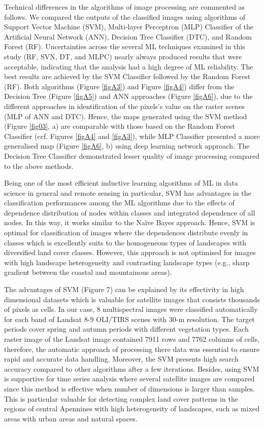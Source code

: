 \documentclass[remotesensing,article,submit,pdftex,moreauthors]{Definitions/mdpi}
\begin{document}
Technical differences in the algorithms of image processing are commented as follows. We compared the outputs of the classified images using algorithms of Support Vector Machine (SVM), Multi-layer Perceptron (MLP) Classifier of the Artificial Neural Network (ANN), Decision Tree Classifier (DTC), and Random Forest (RF). Uncertainties across the several ML techniques examined in this study (RF, SVN, DT, and MLPC) nearly always produced results that were acceptable, indicating that the analysis had a high degree of ML reliability. The best results are achieved by the SVM Classifier followed by the Random Forest (RF). Both algorithms (Figure \ref{figA3}) and Figure \ref{figA4}) differ from the Decision Tree (Figure \ref{figA5}) and ANN approaches (Figure \ref{figA6}), due to the different approaches in  identification of the pixels's value on the raster scenes (MLP of ANN and DTC). Hence, the maps generated using the SVM method (Figure \ref{fig03}, a) are comparable with those based on the Random Forest Classifier (ccf. Figures \ref{figA4} and \ref{figA3}), while MLP Classifier presented a more generalised map (Figure \ref{figA6}, b) using deep learning network approach. The Decision Tree Classifier demonstrated lesser quality of image processing compared to the above methods. 

Being one of the most efficient inductive learning algorithms of ML in data science in general and remote sensing in particular, SVM has advantages in the classification performances among the ML algorithms due to the effects of dependence distribution of nodes within classes and integrated dependence of all nodes. In this way, it works similar to the Naïve Bayes approach. Hence, SVM is optimal for classification of images where the dependences distribute evenly in classes which is excellently suits to the homogeneous types of landscapes with diversified land cover classes. However, this approach is not optimised for images with high landscape heterogeneity and contrasting landscape types (e.g., sharp gradient between the coastal and mountainous areas).

The advantages of SVM (Figure 7) can be explained by its effectivity in high dimensional datasets which is valuable for satellite images that consists thousands of pixels as cells. In our case, 8 multispectral images were classified automatically for each band of Landsat 8-9 OLI/TIRS scenes with 30-m resolution. The target periods cover spring and autumn periods with different vegetation types. Each raster image of the Landsat image contained 7911 rows and 7762 columns of cells, therefore, the automatic approach of processing there data was essential to ensure rapid and accurate data handling. Moreover, the SVM presents high search accuracy compared to other algorithms after a few iterations. Besides, using SVM is supportive for time series analysis where several satellite images are compared since this method is effective when number of dimensions is larger than samples. This is particular valuable for detecting complex land cover patterns in the regions of central Apennines with high heterogeneity of landscapes, such as mixed areas with urban areas and natural spaces. 
\end{document}
